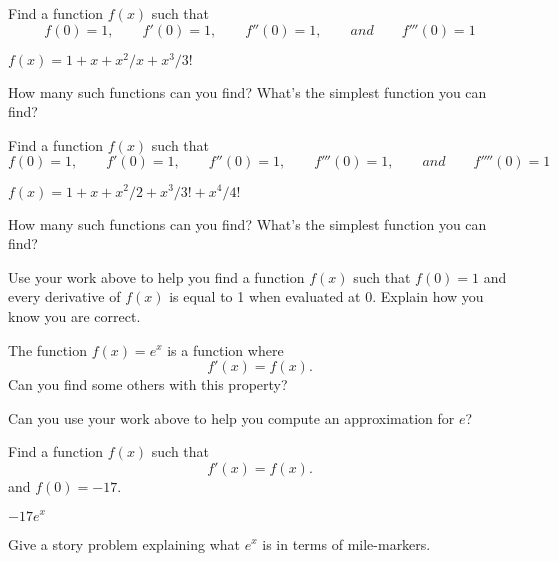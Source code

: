 \documentclass{ximera}
\begin{document}
\begin{question}
  Find a function $f(x)$ such that
  \[
  f(0) = 1,\qquad f'(0) = 1,\qquad f''(0) = 1,\qquad and \qquad f'''(0) = 1
  \]
  \begin{answer}
    $f(x) = 1+x+x^2/x + x^3/3!$
  \end{answer}
  \pause
  How many such functions can you find? What's the simplest function you
  can find?
  \begin{answer}
  \end{answer}
\end{question}

\begin{question}
  Find a function $f(x)$ such that
  \[
  f(0) = 1,\qquad f'(0) = 1, \qquad f''(0)=1, \qquad f'''(0) = 1,\qquad and \qquad f''''(0) = 1
  \]
  \begin{answer}
    $f(x) = 1+x+x^2/2+x^3/3!+x^4/4!$
  \end{answer}
  \pause
  How many such functions can you find? What's the simplest function you
  can find?
  \begin{answer}
  \end{answer}
\end{question}


\begin{question}
  Use your work above to help you find a function $f(x)$ such that $f(0)
  = 1$ and every derivative of $f(x)$ is equal to 1 when evaluated at
  $0$. Explain how you know you are correct.
  \begin{answer}
  \end{answer}
\end{question}



\begin{question}
  The function $f(x) = e^x$ is a function where
  \[
  f'(x) = f(x).
  \]
  Can you find some others with this property? 
  \begin{answer}
  \end{answer}
\end{question}

\begin{question}
  Can you use your work above to help you compute an approximation for
  $e$?
  \begin{answer}
  \end{answer}
\end{question}

\begin{question}
  Find a function $f(x)$ such that
  \[
  f'(x) = f(x).
  \]
  and $f(0) = -17$.
  \begin{answer}
    $-17e^x$
  \end{answer}
\end{question}


\begin{question}
  Give a story problem explaining what $e^x$ is in terms of
  mile-markers.
  \begin{answer}
  \end{answer}
\end{question}
\end{document}

